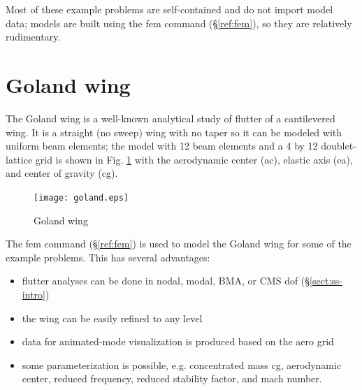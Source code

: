 \documentclass[11pt,openany,twoside]{book}
\numberwithin{equation}{section}		%
\newcommand{\Cmd}[1]{{\sf #1}}
\newcommand{\Sectref}[1]{\S\ref{#1}}
\newcommand{\Figref}[1]{Fig. \ref{#1}}  %
\begin{document}
Most of these example problems are self-contained and do not import
model data; models are built using the \Cmd{fem} command (\Sectref{ref:fem}),
so they are relatively rudimentary.

\section{Goland wing}\label{ex:goland}
The Goland wing \cite{goland1945flutter} is a well-known analytical study
of flutter of a cantilevered wing. It is a straight (no sweep) wing with no taper so
it can be modeled with uniform beam elements; the model with 12 beam
elements and a 4 by 12 doublet-lattice grid is shown in \Figref{fig:goland-wing}
with the aerodynamic center (ac), elastic axis (ea), and center of gravity (cg).
\begin{figure}[ht]
		\texttt{[image: goland.eps]}
	\centering
	\caption{Goland wing} \label{fig:goland-wing}
\end{figure}

The \Cmd{fem} command (\Sectref{ref:fem}) is used to model the
Goland wing for some of the example problems. This has several advantages:
\begin{itemize}
	\item flutter analyses can be done in nodal, modal, BMA,
		or CMS dof (\Sectref{sect:ss-intro})
	\item the wing can be easily refined to any level
	\item data for animated-mode visualization is produced based on the aero grid
	\item some parameterization is possible, e.g. concentrated mass cg, aerodynamic
			center, reduced frequency, reduced stability factor, and mach number.
\end{itemize}
\end{document}
